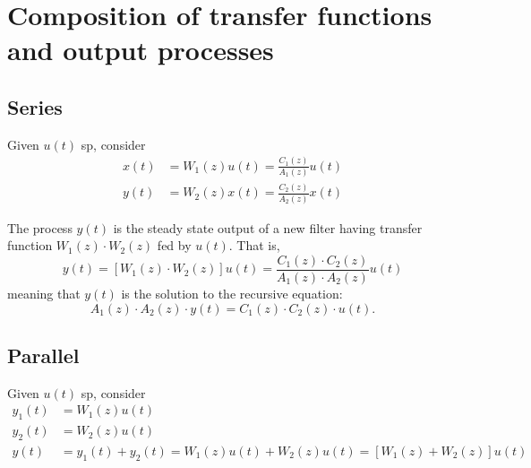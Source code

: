 
\section{Composition of transfer functions and output processes}
\subsection{Series}
Given $u(t)$ \gls{sp}, consider
\begin{align*}
	x(t)&=W_{1}(z)u(t)=\frac{C_{1}(z)}{A_{1}(z)}u(t)\\
	y(t)&=W_{2}(z)x(t)=\frac{C_{2}(z)}{A_{2}(z)}x(t)
\end{align*}

\begin{figure}[htpb]
	\centering
\end{figure}
\FloatBarrier

\begin{theorem}
	The process $y(t)$ is the steady state output of a new filter having transfer function $W_{1}(z)\cdot W_{2}(z)$ fed by $u(t)$. That is,
	\[
		y(t)=[W_{1}(z)\cdot W_{2}(z)]u(t)=\frac{C_{1}(z)\cdot C_{2}(z)}{A_{1}(z)\cdot A_{2}(z)}u(t)
	\]
	meaning that $y(t)$ is the solution to the recursive equation:
	\[
		A_{1}(z)\cdot A_{2}(z)\cdot y(t) = C_{1}(z)\cdot C_{2}(z)\cdot u(t).
	\]
\end{theorem}

\subsection{Parallel}
Given $u(t)$ \gls{sp}, consider
\begin{align*}
	y_{1}(t)&=W_{1}(z)u(t)\\
	y_{2}(t)&=W_{2}(z)u(t)\\
	y(t)&=y_{1}(t)+y_{2}(t)=W_{1}(z)u(t)+W_{2}(z)u(t)=[W_{1}(z)+W_{2}(z)]u(t)
\end{align*}

